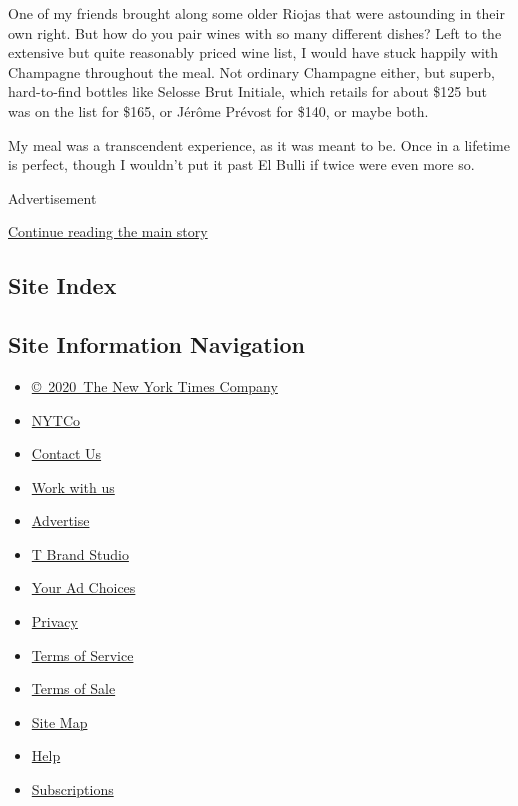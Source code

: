 One of my friends brought along some older Riojas that were astounding
in their own right. But how do you pair wines with so many different
dishes? Left to the extensive but quite reasonably priced wine list, I
would have stuck happily with Champagne throughout the meal. Not
ordinary Champagne either, but superb, hard-to-find bottles like Selosse
Brut Initiale, which retails for about \$125 but was on the list for
\$165, or Jérôme Prévost for \$140, or maybe both.

My meal was a transcendent experience, as it was meant to be. Once in a
lifetime is perfect, though I wouldn't put it past El Bulli if twice
were even more so.

Advertisement

\protect\hyperlink{after-bottom}{Continue reading the main story}

\hypertarget{site-index}{%
\subsection{Site Index}\label{site-index}}

\hypertarget{site-information-navigation}{%
\subsection{Site Information
Navigation}\label{site-information-navigation}}

\begin{itemize}
\tightlist
\item
  \href{https://help.nytimes.com/hc/en-us/articles/115014792127-Copyright-notice}{©~2020~The
  New York Times Company}
\end{itemize}

\begin{itemize}
\tightlist
\item
  \href{https://www.nytco.com/}{NYTCo}
\item
  \href{https://help.nytimes.com/hc/en-us/articles/115015385887-Contact-Us}{Contact
  Us}
\item
  \href{https://www.nytco.com/careers/}{Work with us}
\item
  \href{https://nytmediakit.com/}{Advertise}
\item
  \href{http://www.tbrandstudio.com/}{T Brand Studio}
\item
  \href{https://www.nytimes.com/privacy/cookie-policy\#how-do-i-manage-trackers}{Your
  Ad Choices}
\item
  \href{https://www.nytimes.com/privacy}{Privacy}
\item
  \href{https://help.nytimes.com/hc/en-us/articles/115014893428-Terms-of-service}{Terms
  of Service}
\item
  \href{https://help.nytimes.com/hc/en-us/articles/115014893968-Terms-of-sale}{Terms
  of Sale}
\item
  \href{https://spiderbites.nytimes.com}{Site Map}
\item
  \href{https://help.nytimes.com/hc/en-us}{Help}
\item
  \href{https://www.nytimes.com/subscription?campaignId=37WXW}{Subscriptions}
\end{itemize}
